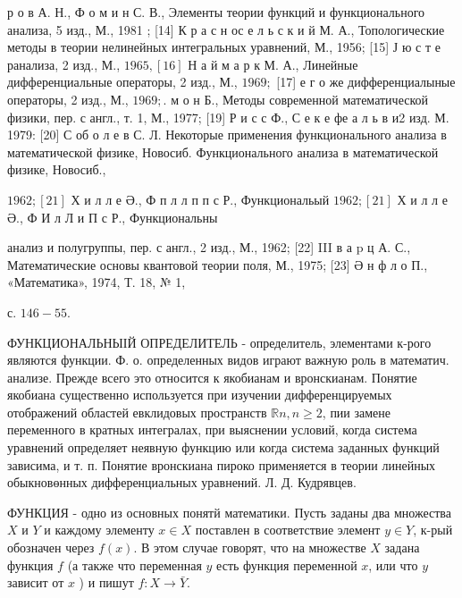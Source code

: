 \documentclass[10pt]{article}
\begin{document}
р о в А. Н., Ф о м и н С. В., Элементы теории функций и функционального анализа, 5 изд., М., 1981 ; [14] К р а с н ос е л ь с к и й М. А., Топологические методы в теории нелинейных интегральных уравнений, М., 1956; [15] Ј ю с т е ранализа, 2 изд., М., $1965,[16]$ Н а й м а р к М. А., Линейные дифференциальные операторы, 2 изд., М., $1969 ;$ [17] е г о же дифференциалыные операторы, 2 изд., М., $1969 ;$. м о н Б., Методы современной математической физики, пер. с англ., т. 1, М., 1977; [19] Р и с с Ф., С е к е фе а л ь в и2 изд. М. 1979: [20] С об о л е в С. Л. Некоторые применения функционального анализа в математической физике, Новосиб. Функционального анализа в математической физике, Новосиб.,

$1962 ;[21]$ Х и л л е Ә., Ф п л л п п с Р., Функциональый $1962 ;[21]$ Х и л л е Ә., Ф И л Л и П с Р., Функциональны

анализ и полугруппы, пер. с англ., 2 изд., М., 1962; [22] III в а $\mathrm{p}$ ц А. С., Математические основы квантовой теории поля, М., 1975; [23] Ә н ф л о П., «Математика», 1974, Т. 18, № 1,

с. $146-55$.



ФУНКЦИОНАЛЬНЫІЙ ОПРЕДЕЛИТЕЛЬ - определитель, элементами к-рого являются функции. Ф. о. определенных видов играют важную роль в математич. анализе. Прежде всего это относится к якобианам и вронскианам. Понятие якобиана существенно используется при изучении дифференцируемых отображений областей евклидовых пространств $\mathbb{R} n, n \geqslant 2$, пии замене переменного в кратных интегралах, при выяснении условий, когда система уравнений определяет неявную функцию или когда система заданных функций зависима, и т. п. Понятие вронскиана пироко применяется в теории линейных обыкновөнных дифференциальных уравнений. Л. Д. Кудрявцев.



ФУНКЦИЯ - одно из основных понятй математики. Пусть заданы два множества $X$ и $Y$ и каждому элементу $x \in X$ поставлен в соответствие элемент $y \in Y$, к-рый обозначен через $f(x)$. В этом случае говорят, что на множестве $X$ задана функция $f$ (а также что переменная $y$ есть функция переменной $x$, или что $y$ зависит от $x$ ) и пишут $f: X \rightarrow \bar{Y}$.
\end{document}
